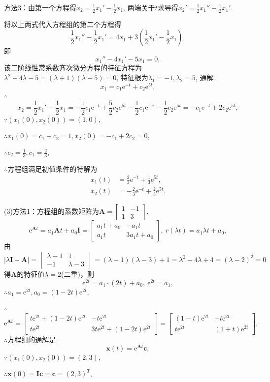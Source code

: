 \documentclass[12pt,UTF8]{ctexart}
\newcommand{\me}[0]{\mathrm e}
\begin{document}
\begin{enumerate}
方法3：由第一个方程得$x_2=\frac12x_1'-\frac12x_1$, 两端关于$t$求导得$x_2'=\frac12x_1''-\frac12x_1'$.

将以上两式代入方程组的第二个方程得
\[\frac12x_1''-\frac12x_1'=4x_1+3(\frac12x_1'-\frac12x_1),\]
即\[x_1''-4x_1'-5x_1=0,\]
该二阶线性常系数齐次微分方程的特征方程为$\lambda^2-4\lambda-5=(\lambda+1)(\lambda-5)=0$, 特征根为$\lambda_1=-1,\lambda_2=5$, 通解\[x_1=c_1\me^{-t}+c_2\me^{5t},\]
$\therefore$
\[x_2=\frac12x_1'-\frac12x_1=-\frac12c_1\me^{-t}+\frac52c_2\me^{5t}-\frac12c_1\me^{-x}-\frac12c_2\me^{5t}=-c_1\me^{-t}+2c_2\me^{5t},\]
$\because(x_1(0),x_2(0))=(1,0)$,

$\therefore x_1(0)=c_1+c_2=1,x_2(0)=-c_1+2c_2=0$,

$\therefore c_2=\frac13,c_1=\frac23$,

$\therefore$方程组满足初值条件的特解为
\[\begin{aligned}
x_1(t)&=\frac23\me^{-t}+\frac13\me^{5t},\\
x_2(t)&=-\frac23\me^{-t}+\frac23\me^{5t}.
\end{aligned}\]

(3)方法1：方程组的系数矩阵为$\bm A=\begin{bmatrix}1&-1\\1&3\end{bmatrix}$,
\[\me^{\bm At}=a_1\bm At+a_0\bm I=\begin{bmatrix}a_1t+a_0&-a_1t\\a_1t&3a_1t+a_0\end{bmatrix},\ r(\lambda t)=a_1\lambda t+a_0,\]
由$|\lambda\bm I-\bm A|=\begin{vmatrix}\lambda-1&1\\-1&\lambda-3\end{vmatrix}=(\lambda-1)(\lambda-3)+1=\lambda^2-4\lambda+4=(\lambda-2)^2=0$得$\bm A$的特征值$\lambda=2$(二重)，则
\[\me^{2t}=a_1\cdot(2t)+a_0,\ \me^{2t}=a_1,\]
$\therefore a_1=\me^{2t},a_0=(1-2t)\me^{2t}$,

$\therefore$
\[\me^{\bm At}=\begin{bmatrix}t\me^{2t}+(1-2t)\me^{2t}&-t\me^{2t}\\t\me^{2t}&3t\me^{2t}+(1-2t)\me^{2t}\end{bmatrix}=\begin{bmatrix}(1-t)\me^{2t}&-t\me^{2t}\\t\me^{2t}&(1+t)\me^{2t}\end{bmatrix},\]
$\therefore$方程组的通解是
\[\bm x(t)=\me^{\bm At}\bm c,\]
$\because(x_1(0),x_2(0))=(2,3)$,

$\therefore\bm x(0)=\bm I\bm c=\bm c=(2,3)^T$,


\end{enumerate}
\end{document}
